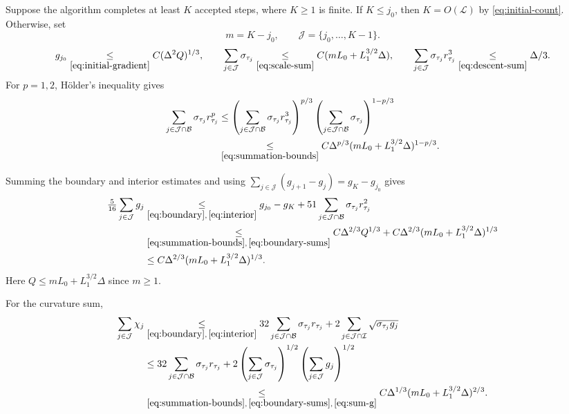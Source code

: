 Suppose the algorithm completes at least $K$ accepted steps, where $K\ge1$ is finite.
If $K\le j_0$, then $K=O(\mathcal L)$ by \eqref{eq:initial-count}.
Otherwise, set
\[
 m=K-j_0,\qquad \mathcal J=\{j_0,\ldots,K-1\}.
\]
\begin{equation}\label{eq:summation-bounds}
 g_{j_0}\underset{\eqref{eq:initial-gradient}}{\le}C(\Delta^2Q)^{1/3},\qquad
 \sum_{j\in\mathcal J}\sigma_{\tau_j}
       \underset{\eqref{eq:scale-sum}}{\le}C(mL_0+L_1^{3/2}\Delta),\qquad
 \sum_{j\in\mathcal J}\sigma_{\tau_j}r_{\tau_j}^3
       \underset{\eqref{eq:descent-sum}}{\le}\Delta/3.
\end{equation}
For $p=1,2$, H\"older's inequality gives
\begin{align}
 \sum_{j\in\mathcal J\cap\mathcal B}\sigma_{\tau_j}r_{\tau_j}^p
 &\le
       \left(\sum_{j\in\mathcal J\cap\mathcal B}
                         \sigma_{\tau_j}r_{\tau_j}^3\right)^{p/3}
       \left(\sum_{j\in\mathcal J\cap\mathcal B}
                         \sigma_{\tau_j}\right)^{1-p/3}\nonumber\\
 &\underset{\eqref{eq:summation-bounds}}{\le}C\Delta^{p/3}
             (mL_0+L_1^{3/2}\Delta)^{1-p/3}.
 \label{eq:boundary-sums}
\end{align}

Summing the boundary and interior estimates and using
$\sum_{j\in\mathcal J}(g_{j+1}-g_j)=g_K-g_{j_0}$ gives
\begin{align}
 \tfrac5{16}\sum_{j\in\mathcal J}g_j
 &\underset{\eqref{eq:boundary},\,\eqref{eq:interior}}{\le}g_{j_0}-g_K
       +51\sum_{j\in\mathcal J\cap\mathcal B}
                        \sigma_{\tau_j}r_{\tau_j}^2\nonumber\\
 &\underset{\eqref{eq:summation-bounds},\,\eqref{eq:boundary-sums}}{\le}C\Delta^{2/3}Q^{1/3}
       +C\Delta^{2/3}(mL_0+L_1^{3/2}\Delta)^{1/3}\nonumber\\
 &\le C\Delta^{2/3}
                         (mL_0+L_1^{3/2}\Delta)^{1/3}.
 \label{eq:sum-g}
\end{align}
Here $Q\le mL_0+L_1^{3/2}\Delta$ since $m\ge1$.

For the curvature sum,
\begin{align}
 \sum_{j\in\mathcal J}\chi_j
 &\underset{\eqref{eq:boundary},\,\eqref{eq:interior}}{\le}
       32\sum_{j\in\mathcal J\cap\mathcal B}
                         \sigma_{\tau_j}r_{\tau_j}
       +2\sum_{j\in\mathcal J\cap\mathcal I}
                         \sqrt{\sigma_{\tau_j}g_j}\nonumber\\
 &\le
       32\sum_{j\in\mathcal J\cap\mathcal B}
                         \sigma_{\tau_j}r_{\tau_j}
       +2\left(\sum_{j\in\mathcal J}\sigma_{\tau_j}\right)^{1/2}
          \left(\sum_{j\in\mathcal J}g_j\right)^{1/2}\nonumber\\
 &\underset{\eqref{eq:summation-bounds},\,\eqref{eq:boundary-sums},\,\eqref{eq:sum-g}}{\le}C\Delta^{1/3}
                         (mL_0+L_1^{3/2}\Delta)^{2/3}.
 \label{eq:sum-curvature}
\end{align}

